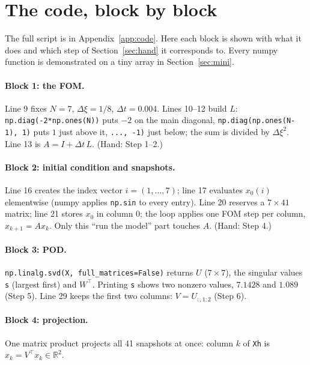 \documentclass[11pt]{article}
\theoremstyle{remark}\newtheorem{remark}{Remark}
\newcommand{\R}{\mathbb{R}}
\newcommand{\xh}{\hat{x}}
\begin{document}
\section{The code, block by block}\label{sec:code}
The full script is in Appendix~\ref{app:code}. Here each block is shown with what it does and which step of Section~\ref{sec:hand} it corresponds to. Every numpy function is demonstrated on a tiny array in Section~\ref{sec:mini}.

\paragraph{Block 1: the FOM.}

Line 9 fixes $N=7$, $\Delta\xi=1/8$, $\Delta t=0.004$. Lines 10--12 build $L$: \texttt{np.diag(-2*np.ones(N))} puts $-2$ on the main diagonal, \texttt{np.diag(np.ones(N-1), 1)} puts $1$ just above it, \texttt{..., -1)} just below; the sum is divided by $\Delta\xi^2$. Line 13 is $A=I+\Delta t\,L$. (Hand: Step 1--2.)

\paragraph{Block 2: initial condition and snapshots.}

Line 16 creates the index vector $i=(1,\dots,7)$; line 17 evaluates $x_0(i)$ elementwise (numpy applies \texttt{np.sin} to every entry). Line 20 reserves a $7\times41$ matrix; line 21 stores $x_0$ in column $0$; the loop applies one FOM step per column, $x_{k+1}=Ax_k$. Only this ``run the model'' part touches $A$. (Hand: Step 4.)

\paragraph{Block 3: POD.}

\texttt{np.linalg.svd(X, full\_matrices=False)} returns $U$ ($7\times7$), the singular values \texttt{s} (largest first) and $W^\top$. Printing \texttt{s} shows two nonzero values, $7.1428$ and $1.089$ (Step 5). Line 29 keeps the first two columns: $V=U_{:,1:2}$ (Step 6).

\paragraph{Block 4: projection.}

One matrix product projects all 41 snapshots at once: column $k$ of \texttt{Xh} is $\xh_k=V^\top x_k\in\R^2$.
\end{document}
